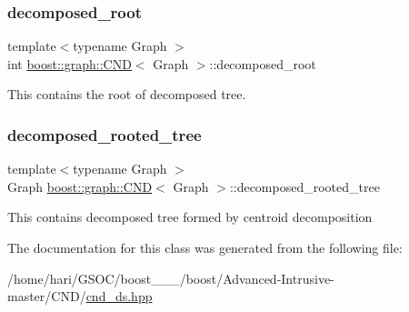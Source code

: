 \subsubsection{\texorpdfstring{decomposed\+\_\+root}{decomposed\_root}}
{\footnotesize\ttfamily template$<$typename Graph $>$ \\
int \hyperlink{classboost_1_1graph_1_1CND}{boost\+::graph\+::\+C\+ND}$<$ Graph $>$\+::decomposed\+\_\+root}

This contains the root of decomposed tree. \mbox{\label{classboost_1_1graph_1_1CND_a21a1bc72301bab671c59c1e290b03e36}} 
\subsubsection{\texorpdfstring{decomposed\+\_\+rooted\+\_\+tree}{decomposed\_rooted\_tree}}
{\footnotesize\ttfamily template$<$typename Graph $>$ \\
Graph \hyperlink{classboost_1_1graph_1_1CND}{boost\+::graph\+::\+C\+ND}$<$ Graph $>$\+::decomposed\+\_\+rooted\+\_\+tree}

This contains decomposed tree formed by centroid decomposition 

The documentation for this class was generated from the following file\+:\begin{DoxyCompactItemize}
\item 
/home/hari/\+G\+S\+O\+C/boost\+\_\+\_\+\_/boost/\+Advanced-\/\+Intrusive-\/master/\+C\+N\+D/\hyperlink{cnd__ds_8hpp}{cnd\+\_\+ds.\+hpp}\end{DoxyCompactItemize}
